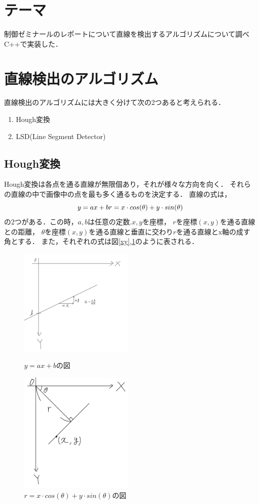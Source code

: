 \documentclass[titlepage]{jarticle}
\begin{document}
\section{テーマ}
制御ゼミナールのレポートについて直線を検出するアルゴリズムについて調べC++で実装した．
\section{直線検出のアルゴリズム}
直線検出のアルゴリズムには大きく分けて次の2つあると考えられる．
\begin{enumerate}
  \item Hough変換
  \item LSD(Line Segment Detector)
\end{enumerate}
\subsection{Hough変換}
Hough変換は各点を通る直線が無限個あり，それが様々な方向を向く．
それらの直線の中で画像中の点を最も多く通るものを決定する．
直線の式は，
\begin{equation}
  y = ax + b\\
  r = x \cdot cos(\theta) + y \cdot sin(\theta)\label{equ:r}\\
\end{equation}
の2つがある．この時，$a,b$は任意の定数.$x,y$を座標，
$r$を座標$(x,y)$を通る直線との距離，
$\theta$を座標$(x,y)$を通る直線と垂直に交わり$r$を通る直線とx軸の成す角とする．
また，それぞれの式は図\ref{xy},\ref{rtheta}のように表される．
\begin{figure}[H]
  \begin{minipage}{0.495\hsize}
    \centering
    \includegraphics[width=5.5cm]{img/image.png}
    \caption{$y = ax + b$の図}
    \label{xy}
  \end{minipage}
  \begin{minipage}{0.495\hsize}
    \centering
    \includegraphics[width=5.5cm]{img/rtheta.png}
    \caption{$r = x \cdot cos(\theta) + y \cdot sin(\theta)$の図}
    \label{rtheta}
  \end{minipage}
\end{figure}
\end{document}
